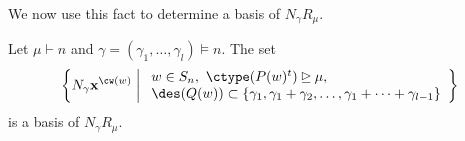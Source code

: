 We now use this fact to determine a basis of $N_\gamma R_{\mu}$.
\begin{prop2}
\makeatletter{}\makeatother
\label{prop:prop2}

    Let $\mu \vdash n$  and $\gamma = (\gamma_1,\dots, \gamma_l)\models n$. 
    The set
    \begin{align}\label{eq:antisym basis}
    \left\{ N_\gamma \mathbf{x}^{\cw(w)} \biggm|
    \begin{array}{l}  w \in S_n, \ \ctype(P(w)^t) \unrhd\mu, \\
      \des(Q(w)) \subset \{\gamma_1,\gamma_1 + \gamma_2, \dots, \gamma_1 + \cdots + \gamma_{l-1}\}
    \end{array}
    \right\}
    \end{align}
    is
    a basis of $N_\gamma R_{\mu}$.
\end{prop2}

